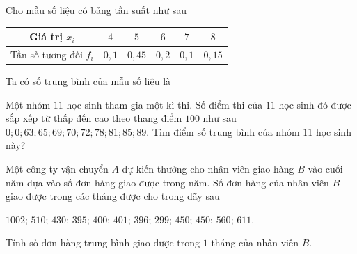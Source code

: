 




\begin{bt}%
	Cho mẫu số liệu có bảng tần suất  như sau
	\begin{center}
		\begin{tabular}{|c|c|c|c|c|c|}
			\hline 
			Giá trị $x_i$ & $4$ & $5$ &  $6$ & $7$ & $8$\\
			 \hline
			Tần số tương đối $f_i$ & $0{,}1$ & $0{,}45$ &  $0{,}2$ & $0{,}1$ & $0{,}15$\\
			 \hline
		\end{tabular}
	\end{center}
	Ta có số trung bình của mẫu số  liệu là
\end{bt}

\begin{bt}%
	Một nhóm $11$ học sinh tham gia một kì thi. Số điểm thi của $11$ học sinh đó được sắp xếp từ thấp đến cao theo thang điểm $100$ như sau $0;0;63;65;69;70;72;78;81;85;89$. Tìm điểm  số trung bình của nhóm $11$ học sinh này?
\end{bt}




\begin{bt}%
	Một  công ty vận chuyển $A$ dự kiến thưởng cho nhân viên giao hàng $B$ vào cuối năm dựa vào số đơn hàng giao được trong năm. Số đơn hàng của nhân viên $B$ giao được trong các tháng được cho trong dãy sau
	\begin{center}
		$1002$; $510$; $430$; $395$; $400$; $401$; $396$; $299$; $450$; $450$; $560$;  $611$.
	\end{center}
	Tính số đơn hàng  trung bình giao được trong $1$ tháng của nhân viên $B$.
\end{bt}

